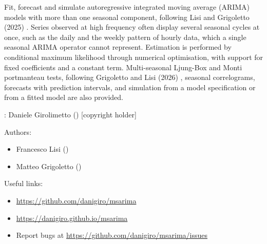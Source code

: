 \documentclass[a4paper]{book}
\begin{document}
%
\begin{Description}
Fit, forecast and simulate autoregressive integrated moving average (ARIMA) models with more than one seasonal component, following Lisi and Grigoletto (2025) . Series observed at high frequency often display several seasonal cycles at once, such as the daily and the weekly pattern of hourly data, which a single seasonal ARIMA operator cannot represent. Estimation is performed by conditional maximum likelihood through numerical optimisation, with support for fixed coefficients and a constant term. Multi-seasonal Ljung-Box and Monti portmanteau tests, following Grigoletto and Lisi (2026) , seasonal correlograms, forecasts with prediction intervals, and simulation from a model specification or from a fitted model are also provided.
\end{Description}
%
\begin{Author}
: Daniele Girolimetto  () [copyright holder]

Authors:
\begin{itemize}

\item{} Francesco Lisi  ()
\item{} Matteo Grigoletto  ()

\end{itemize}


\end{Author}
%
\begin{SeeAlso}
Useful links:
\begin{itemize}

\item{} \url{https://github.com/danigiro/msarima}
\item{} \url{https://danigiro.github.io/msarima}
\item{} Report bugs at \url{https://github.com/danigiro/msarima/issues}

\end{itemize}


\end{SeeAlso}
\end{document}
